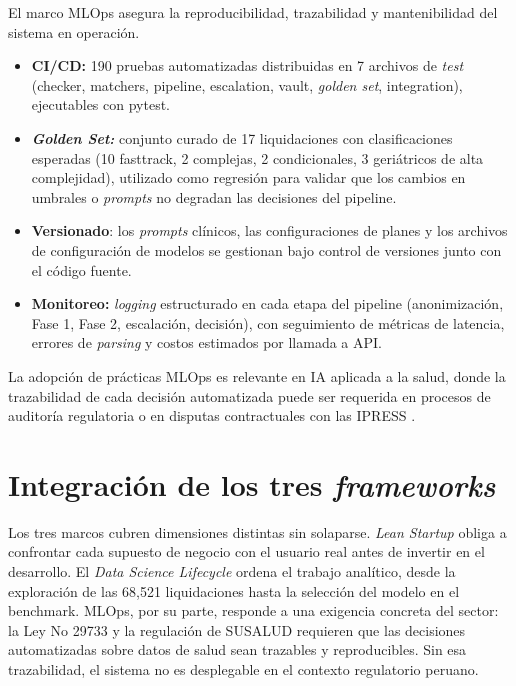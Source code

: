 El marco MLOps asegura la reproducibilidad, trazabilidad y mantenibilidad del sistema en operación.
\begin{itemize}
    \item \textbf{CI/CD:} 190 pruebas automatizadas distribuidas en 7 archivos de \textit{test} (checker, matchers, pipeline, escalation, vault, \textit{golden set}, integration), ejecutables con pytest.

    \item \textbf{\textit{Golden Set:}}  conjunto curado de 17 liquidaciones con clasificaciones esperadas (10 fasttrack, 2 complejas, 2 condicionales, 3 geriátricos de alta complejidad), utilizado como regresión para validar que los cambios en umbrales o \textit{prompts} no degradan las decisiones del pipeline.
    
    \item \textbf{Versionado}: los \textit{prompts} clínicos, las configuraciones de planes y los archivos de configuración de modelos se gestionan bajo control de versiones junto con el código fuente.

    \item \textbf{Monitoreo:} \textit{logging} estructurado en cada etapa del pipeline (anonimización, Fase 1, Fase 2, escalación, decisión), con seguimiento de métricas de latencia, errores de \textit{parsing} y costos estimados por llamada a API.
       
    
\end{itemize}
La adopción de prácticas MLOps es relevante en IA aplicada a la salud, donde la trazabilidad de cada decisión automatizada puede ser requerida en procesos de auditoría regulatoria o en disputas contractuales con las IPRESS \cite{rajkomar2019machine}.

\section{Integración de los tres \textit{frameworks}}

Los tres marcos cubren dimensiones distintas sin solaparse. \textit{Lean Startup} obliga a confrontar cada supuesto de negocio con el usuario real antes de invertir en el desarrollo. El \textit{Data Science Lifecycle} ordena el trabajo analítico, desde la exploración de las 68,521 liquidaciones hasta la selección del modelo en el benchmark. MLOps, por su parte, responde a una exigencia concreta del sector: la Ley No 29733 \cite{peru2011ley29733} y la regulación de SUSALUD \cite{susalud2023anuario} requieren que las decisiones automatizadas sobre datos de salud sean trazables y reproducibles. Sin esa trazabilidad, el sistema no es desplegable en el contexto regulatorio peruano.
\newpage
